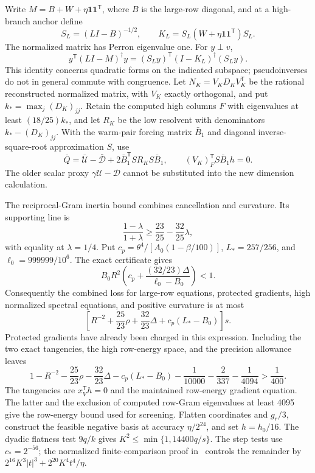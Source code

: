\documentclass[11pt]{amsart}
\theoremstyle{definition}\newtheorem{definition}[theorem]{Definition}
\theoremstyle{remark}\newtheorem{remark}[theorem]{Remark}
\numberwithin{equation}{section}
\newcommand{\one}{\mathbf1}
\newcommand{\T}{\mathsf T}
\begin{document}
Write $M=B+W+\eta\one\one^\T$, where $B$ is the large-row diagonal,
and at a high-branch anchor define
\[
 S_L=(LI-B)^{-1/2},\qquad K_L=S_L(W+\eta\one\one^\T)S_L.
\]
The normalized matrix has Perron eigenvalue one. For $y\perp v$,
\begin{equation}\label{fin:response}
 y^\T(LI-M)^\dagger y
 =(S_Ly)^\T(I-K_L)^\dagger(S_Ly).
\end{equation}
This identity concerns quadratic forms on the indicated subspace;
pseudoinverses do not in general commute with congruence.
Let $N_K=V_KD_KV_K^\T$ be the rational reconstructed normalized
matrix, with $V_K$ exactly orthogonal, and put $k_* =\max_j(D_K)_{jj}$.
Retain the computed high columns $F$ with eigenvalues at least
$(18/25)k_*$, and let $R_K$ be the low resolvent with denominators
$k_*-(D_K)_{jj}$. With the warm-pair forcing matrix $\bar B_1$ and
diagonal inverse-square-root approximation $S$, use
\begin{equation}\label{fin:proxy}
 \bar Q=\bar{\mathcal U}-\bar{\mathcal D}
           +2\bar B_1^\T S R_K S\bar B_1,
 \qquad (V_K)_F^\T S\bar B_1h=0.
\end{equation}
The older scalar proxy $\gamma\mathcal U-\mathcal D$ cannot be
substituted into the new dimension calculation.

The reciprocal-Gram inertia bound combines cancellation and curvature.
Its supporting line is
\[
 \frac{1-\lambda}{1+\lambda}
 \ge\frac{23}{25}-\frac{32}{25}\lambda,
\]
with equality at $\lambda=1/4$. Put
$c_p=\theta^4/[A_0(1-\beta/100)]$,
$L_*=257/256$, and $\ell_0=999999/10^6$. The exact certificate gives
\[
 B_0R^2\left(c_p+\frac{(32/23)\Delta}{\ell_0-B_0}\right)<1.
\]
Consequently the combined loss for large-row equations, protected
gradients, high normalized spectral equations, and positive curvature
is at most
\[
 \left[R^{-2}+\frac{25}{23}\rho+\frac{32}{23}\Delta
                 +c_p(L_*-B_0)\right]s.
\]
Protected gradients have already been charged in this expression.
Including the two exact tangencies, the high row-energy space, and
the precision allowance leaves
\begin{equation}\label{fin:dimension}
 1-R^{-2}-\frac{25}{23}\rho-\frac{32}{23}\Delta-c_p(L_*-B_0)
 -\frac1{10000}-\frac2{337}-\frac1{4094}
 >\frac1{400}.
\end{equation}
The tangencies are $x_V^\T h=0$ and the maintained row-energy gradient
equation. The latter and the exclusion of computed row-Gram eigenvalues
at least 4095 give the row-energy bound used for screening.
Flatten coordinates and $g_r/3$, construct the feasible negative basis
at accuracy $\eta/2^{24}$, and set $h=h_0/16$. The dyadic flatness test
$9q/k$ gives $K^2\le\min\{1,14400q/s\}$. The step tests use
$c_*=2^{-56}$; the normalized finite-comparison proof in~\cite{Final37}
controls the remainder by
$2^{16}K^3|t|^3+2^{20}K^4t^4/\eta$.
\end{document}
